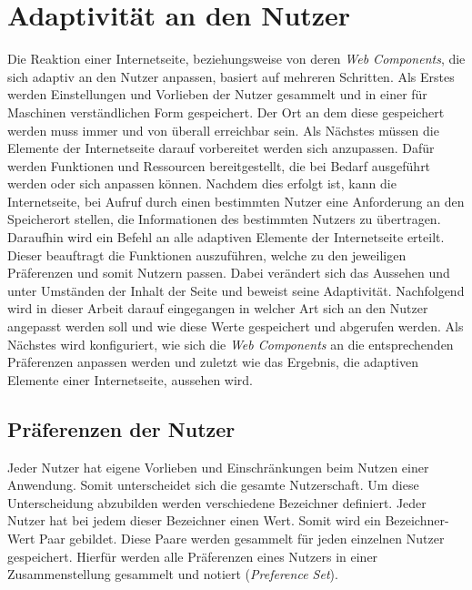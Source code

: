 \documentclass[12pt, paper=a4, bibtotoc, toc=listof, headsepline=true]{scrreprt}
\begin{document}
\chapter{Adaptivität an den Nutzer}
Die Reaktion einer Internetseite, beziehungsweise von deren \emph{Web Components}, die sich adaptiv an den Nutzer anpassen, basiert auf mehreren Schritten. Als Erstes werden Einstellungen und Vorlieben der Nutzer gesammelt und in einer für Maschinen verständlichen Form gespeichert. Der Ort an dem diese gespeichert werden muss immer und von überall erreichbar sein. Als Nächstes müssen die Elemente der Internetseite darauf vorbereitet werden sich anzupassen. Dafür werden Funktionen und Ressourcen bereitgestellt, die bei Bedarf ausgeführt werden oder sich anpassen können. Nachdem dies erfolgt ist, kann die Internetseite, bei Aufruf durch einen bestimmten Nutzer eine Anforderung an den Speicherort stellen, die Informationen des bestimmten Nutzers zu übertragen. Daraufhin wird ein Befehl an alle adaptiven Elemente der Internetseite erteilt. Dieser beauftragt die Funktionen auszuführen, welche zu den jeweiligen Präferenzen und somit Nutzern passen. Dabei verändert sich das Aussehen und unter Umständen der Inhalt der Seite und beweist seine Adaptivität.\newline
Nachfolgend wird in dieser Arbeit darauf eingegangen in welcher Art sich an den Nutzer angepasst werden soll und wie diese Werte gespeichert und abgerufen werden. Als Nächstes wird konfiguriert, wie sich die \emph{Web Components} an die entsprechenden Präferenzen anpassen werden und zuletzt wie das Ergebnis, die adaptiven Elemente einer Internetseite, aussehen wird.
\section{Präferenzen der Nutzer}
Jeder Nutzer hat eigene Vorlieben und Einschränkungen beim Nutzen einer Anwendung. Somit unterscheidet sich die gesamte Nutzerschaft. Um diese Unterscheidung abzubilden werden verschiedene Bezeichner definiert. Jeder Nutzer hat bei jedem dieser Bezeichner einen Wert. Somit wird ein Bezeichner-Wert Paar gebildet. Diese Paare werden gesammelt für jeden einzelnen Nutzer gespeichert. Hierfür werden alle Präferenzen eines Nutzers in einer Zusammenstellung gesammelt und notiert (\emph{Preference Set}).
\end{document}
